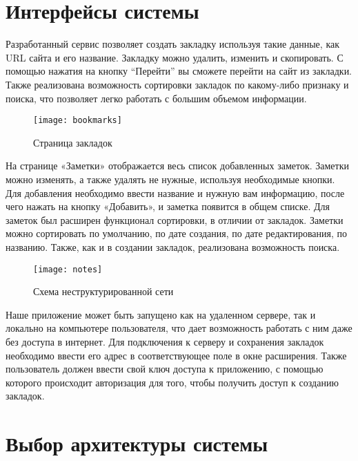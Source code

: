 \section{Интерфейсы системы}
Разработанный сервис позволяет создать закладку используя такие данные, как URL сайта и его название. Закладку можно удалить, изменить и скопировать. С помощью нажатия на кнопку “Перейти” вы сможете перейти на сайт из закладки. Также реализована возможность сортировки закладок по какому-либо признаку и поиска, что позволяет легко работать с большим объемом информации.

\begin{figure}[H]
	\begin{center}
		\texttt{[image: bookmarks]}
		\caption{Страница закладок}
		\label{pic:bookmarks} %
	\end{center}
\end{figure}

На странице «Заметки» отображается весь список добавленных заметок. Заметки можно изменять, а также удалять не нужные, используя необходимые кнопки. Для добавления необходимо ввести название и нужную вам информацию, после чего нажать на кнопку «Добавить», и заметка появится в общем списке. Для заметок был расширен функционал сортировки, в отличии от закладок. Заметки можно сортировать по умолчанию, по дате создания, по дате редактирования, по названию. Также, как и в создании закладок, реализована возможность поиска.

\begin{figure}[H]
	\begin{center}
		\texttt{[image: notes]}
		\caption{Схема неструктурированной сети}
		\label{pic:notes} %
	\end{center}
\end{figure}

Наше приложение может быть запущено как на удаленном сервере, так и локально на компьютере пользователя, что дает возможность работать с ним даже без доступа в интернет. Для подключения к серверу и сохранения закладок необходимо ввести его адрес в соответствующее поле в окне расширения. Также пользователь должен ввести свой ключ доступа к приложению, с помощью которого происходит авторизация для того, чтобы получить доступ к созданию закладок.

\section{Выбор архитектуры системы}


